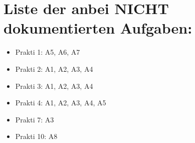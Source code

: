 
\section{Liste der anbei NICHT dokumentierten Aufgaben:}
\begin{itemize}
	\item Prakti 1: A5, A6, A7
	\item Prakti 2: A1, A2, A3, A4
	\item Prakti 3: A1, A2, A3, A4
	\item Prakti 4: A1, A2, A3, A4, A5
	\item Prakti 7: A3 
	\item Prakti 10: A8
\end{itemize}
\setcounter{section}{1}
\setcounter{subsection}{0}

%
%
%
%
%
\setcounter{section}{2}
\setcounter{subsection}{1}

%
%
\setcounter{section}{3}
\setcounter{subsection}{1}

%

\setcounter{section}{4}
\setcounter{subsection}{1}

%
\setcounter{section}{5}
\setcounter{subsection}{1}

%

